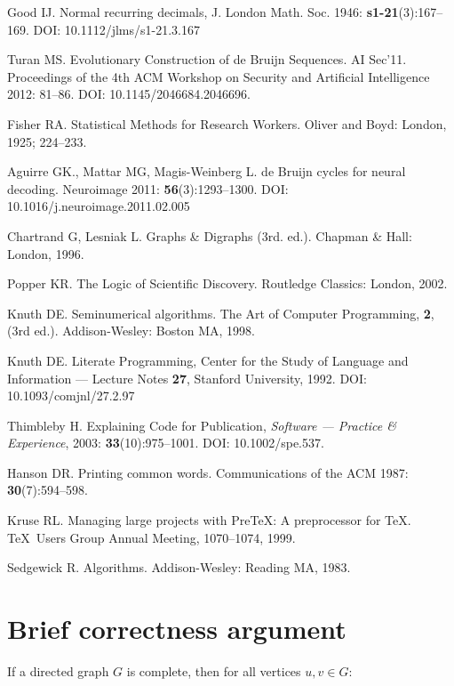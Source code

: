 \documentclass[12pt]{article}
\begin{document}
{\begin{thebibliography}{00}
Good IJ. Normal recurring decimals, J. London Math. Soc. 1946: \textbf{s1-21}(3):167--169. DOI: 10.1112/jlms/s1-21.3.167

Turan MS. Evolutionary Construction of de Bruijn Sequences. AI Sec'11. Proceedings of the 4th ACM Workshop on Security and Artificial Intelligence 2012: 81--86. DOI: 10.1145/2046684.2046696.

Fisher RA. Statistical Methods for Research Workers. Oliver and Boyd: London, 1925; 224--233.

Aguirre GK., Mattar MG, Magis-Weinberg L. de Bruijn cycles for neural decoding. Neuroimage 2011: \textbf{56}(3):1293--1300. DOI: 10.1016/j.neuroimage.2011.02.005


Chartrand G, Lesniak L. Graphs \& Digraphs (3rd. ed.). Chapman \& Hall: London, 1996.

Popper KR. The Logic of Scientific Discovery. Routledge Classics: London, 2002.

Knuth DE. Seminumerical algorithms. The Art of Computer Programming, \textbf{2}, (3rd ed.). Addison-Wesley: Boston MA, 1998.

Knuth DE. Literate Programming, Center for the Study of Language and Information --- Lecture Notes \textbf{27}, Stanford University, 1992. DOI: 10.1093/comjnl/27.2.97

Thimbleby H. Explaining Code for Publication, \emph{Software --- Practice {\&} Experience}, 2003: \textbf{33}(10):975--1001. DOI: 10.1002/spe.537.

Hanson DR. Printing common words. Communications of the ACM 1987: \textbf{30}(7):594--598.

Kruse RL. Managing large projects with Pre\TeX: A preprocessor for \TeX. \TeX\ Users Group Annual Meeting, 1070--1074, 1999.

Sedgewick R. Algorithms. Addison-Wesley: Reading MA, 1983.

\end{thebibliography}}

\appendix 
\section{Brief correctness argument}
If a directed graph $G$ is complete, then for all vertices $u,v \in G$\/:
\end{document}
